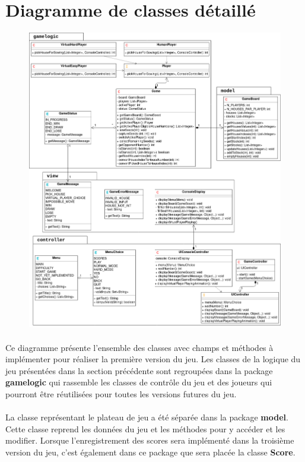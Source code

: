 \documentclass{article}
\begin{document}
    \section{Diagramme de classes détaillé}
    \begin{figure}[H]
        \centering
        \includegraphics[width=0.94\linewidth]{./schemas/classes2.png}
    \end{figure}

    \paragraph{}
    Ce diagramme présente l'ensemble des classes avec champs et méthodes à implémenter pour réaliser la première version du jeu. Les classes de la logique du jeu présentées dans la section précédente sont regroupées dans la package \textbf{gamelogic} qui rassemble les classes de contrôle du jeu et des joueurs qui pourront être réutilisées pour toutes les versions futures du jeu.

    \paragraph{}
    La classe représentant le plateau de jeu a été séparée dans la package \textbf{model}. Cette classe reprend les données du jeu et les méthodes pour y accéder et les modifier. Lorsque l'enregistrement des scores sera implémenté dans la troisième version du jeu, c'est également dans ce package que sera placée la classe \textbf{Score}.
\end{document}
